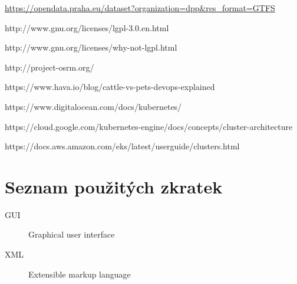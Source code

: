 \documentclass[thesis=M,czech]{FITthesis}[2019/12/23]
\theoremstyle{plain}
\theoremstyle{definition}
\begin{document}
\begin{thebibliography}{9}


\url{https://opendata.praha.eu/dataset?organization=dpp&res_format=GTFS}



http://www.gnu.org/licenses/lgpl-3.0.en.html



http://www.gnu.org/licenses/why-not-lgpl.html


http://project-osrm.org/


https://www.hava.io/blog/cattle-vs-pets-devops-explained



https://www.digitalocean.com/docs/kubernetes/


https://cloud.google.com/kubernetes-engine/docs/concepts/cluster-architecture


https://docs.aws.amazon.com/eks/latest/userguide/clusters.html

\end{thebibliography}


\appendix

\chapter{Seznam použitých zkratek}
\begin{description}
	\item[GUI] Graphical user interface
	\item[XML] Extensible markup language
\end{description}
\end{document}
